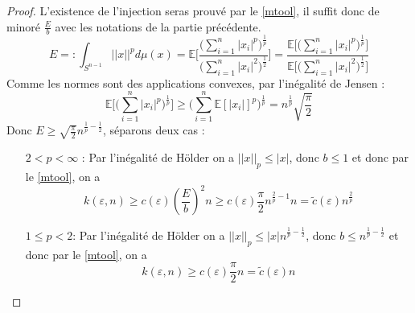 \documentclass[12pt]{article}
\theoremstyle{definition}
\begin{document}
\begin{proof}
L'existence de l'injection seras prouvé par le \cref{mtool}, il suffit donc de minoré $\frac{E}{b}$ avec les notations de la partie précédente.
\begin{equation*}
	E =: \int_{S^{n-1}}||x||^p d\mu(x) = \mathbb{E}\Bigg[\frac{\big(\sum_{i=1}^{n}|x_i|^p\big)^{\frac{1}{p}}}{\big(\sum_{i=1}^{n}|x_i|^2\big)^{\frac{1}{2}}}\Bigg]= \frac{\mathbb{E}\Bigg[\big(\sum_{i=1}^{n}|x_i|^p\big)^{\frac{1}{p}}\Bigg]}{\mathbb{E}\Bigg[\big(\sum_{i=1}^{n}|x_i|^2\big)^{\frac{1}{2}}\Bigg]}
\end{equation*}
Comme les normes sont des applications convexes, par l'inégalité de Jensen :
\begin{equation*}
	\mathbb{E}\Big[\big(\sum_{i=1}^{n}|x_i|^p\big)^{\frac{1}{p}}\Big]\geq \big(\sum_{i=1}^{n}\mathbb{E}[|x_i|]^p\big)^{\frac{1}{p}}=n^{\frac{1}{p}}\sqrt{\frac{\pi}{2}}
\end{equation*}
Donc $E\geq \sqrt{\frac{\pi}{2}}n^{\frac{1}{p}-\frac{1}{2}}$, séparons deux cas :
\begin{enumerate}
	\item[$2<p<\infty$ :] Par l'inégalité de Hölder on a $||x||_p\leq |x|$, donc $b\leq1$ et donc par le \cref{mtool}, on a 
	\begin{equation*}
	k(\varepsilon,n)\geq c(\varepsilon)(\frac{E}{b})^2 n \geq c(\varepsilon)\frac{\pi}{2}n^{\frac{2}{p}-1}n=\tilde{c}(\varepsilon)n^{\frac{2}{p}} 
	\end{equation*}
	\item[$1\leq p<2$:] Par l'inégalité de Hölder on a $||x||_p\leq |x|n^{\frac{1}{p}-\frac{1}{2}}$, donc $b\leq n^{\frac{1}{p}-\frac{1}{2}}$ et donc par le \cref{mtool}, on a 
	\begin{equation*}
		k(\varepsilon,n)\geq c(\varepsilon) \frac{\pi}{2}n=\tilde{c}(\varepsilon)n
	\end{equation*}
\end{enumerate}
\end{proof}
\end{document}
